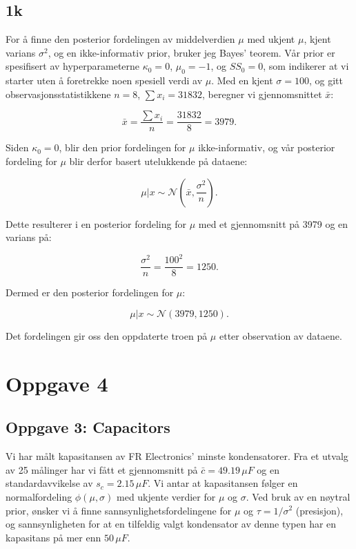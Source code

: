 \documentclass{article}
\begin{document}
\subsection{1k}

For å finne den posterior fordelingen av middelverdien \(\mu\) med ukjent \(\mu\), kjent varians \(\sigma^2\), og en ikke-informativ prior, bruker jeg Bayes' teorem. Vår prior er spesifisert av hyperparameterne \(\kappa_0 = 0\), \(\mu_0 = -1\), og \(SS_0 = 0\), som indikerer at vi starter uten å foretrekke noen spesiell verdi av \(\mu\). Med en kjent \(\sigma = 100\), og gitt observasjonsstatistikkene \(n = 8\), \(\sum x_i = 31832\), beregner vi gjennomsnittet \(\bar{x}\):

\[
\bar{x} = \frac{\sum x_i}{n} = \frac{31832}{8} = 3979.
\]

Siden \(\kappa_0 = 0\), blir den prior fordelingen for \(\mu\) ikke-informativ, og vår posterior fordeling for \(\mu\) blir derfor basert utelukkende på dataene:

\[
\mu | x \sim \mathcal{N}\left(\bar{x}, \frac{\sigma^2}{n}\right).
\]

Dette resulterer i en posterior fordeling for \(\mu\) med et gjennomsnitt på 3979 og en varians på:

\[
\frac{\sigma^2}{n} = \frac{100^2}{8} = 1250.
\]

Dermed er den posterior fordelingen for \(\mu\):

\[
\mu | x \sim \mathcal{N}(3979, 1250).
\]

Det fordelingen gir oss den oppdaterte troen på \(\mu\) etter observation av dataene.




\section{Oppgave 4}
\subsection{Oppgave 3: Capacitors}

Vi har målt kapasitansen av FR Electronics' minste kondensatorer. Fra et utvalg av 25 målinger har vi fått et gjennomsnitt på \(\bar{c} = 49.19 \, \mu F\) og en standardavvikelse av \(s_c = 2.15 \, \mu F\). Vi antar at kapasitansen følger en normalfordeling \(\phi(\mu, \sigma)\) med ukjente verdier for \(\mu\) og \(\sigma\). Ved bruk av en nøytral prior, ønsker vi å finne sannsynlighetsfordelingene for \(\mu\) og \(\tau = 1/\sigma^2\) (presisjon), og sannsynligheten for at en tilfeldig valgt kondensator av denne typen har en kapasitans på mer enn \(50 \, \mu F\).
\end{document}
